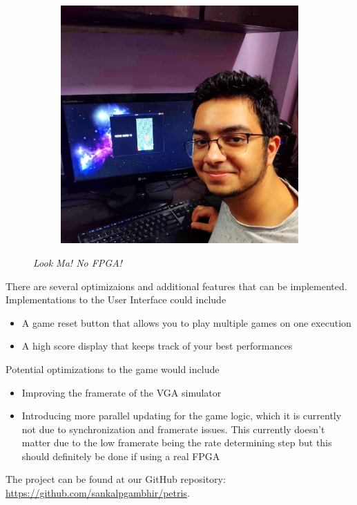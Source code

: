 \begin{figure}[ht]
\begin{subfigure}[b]{0.4\textwidth}
        \includegraphics[width=\textwidth]{fig/demo-sank.jpeg}
    \end{subfigure}
    \caption{\emph{Look Ma! No FPGA!}}
\label{fig:demo}
\end{figure}


There are several optimizaions and additional features that can be implemented. Implementations to the User Interface could include
\begin{itemize}
    \item A game reset button that allows you to play multiple games on one execution
    \item A high score display that keeps track of your best performances
\end{itemize}
Potential optimizations to the game would include
\begin{itemize}
    \item Improving the framerate of the VGA simulator
    \item Introducing more parallel updating for the game logic, which it is currently not due to synchronization and framerate issues. This currently doesn't matter 
     due to the low framerate being the rate determining step but this should definitely be done if using a real FPGA 
\end{itemize}

The project can be found at our GitHub repository: \url{https://github.com/sankalpgambhir/petris}.


